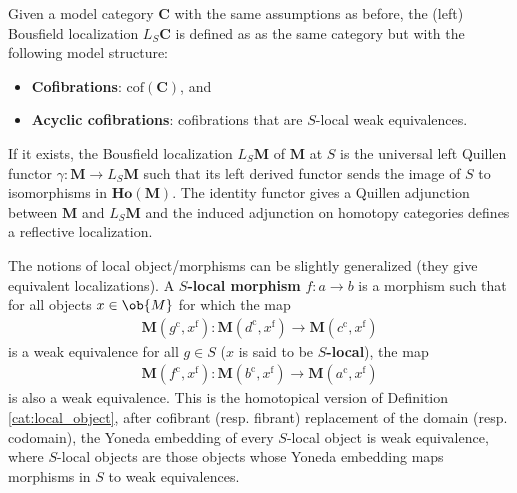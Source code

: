     \begin{construct}
        Given a model category $\mathbf{C}$ with the same assumptions as before, the (left) Bousfield localization $L_S\mathbf{C}$ is defined as as the same category but with the following model structure:
        \begin{itemize}
            \item\textbf{Cofibrations}: $\mathrm{cof}(\mathbf{C})$, and
            \item\textbf{Acyclic cofibrations}: cofibrations that are $S$-local weak equivalences.
        \end{itemize}
        If it exists, the Bousfield localization $L_S\mathbf{M}$ of $\mathbf{M}$ at $S$ is the universal left Quillen functor $\gamma:\mathbf{M}\rightarrow L_S\mathbf{M}$ such that its left derived functor sends the image of $S$ to isomorphisms in $\mathbf{Ho}(\mathbf{M})$. The identity functor gives a Quillen adjunction between $\mathbf{M}$ and $L_S\mathbf{M}$ and the induced adjunction on homotopy categories defines a reflective localization.
    \end{construct}
    \begin{remark}
        The notions of local object/morphisms can be slightly generalized (they give equivalent localizations). A \textbf{$S$-local morphism} $f:a\rightarrow b$ is a morphism such that for all objects $x\in\ob{M}$ for which the map
        \begin{gather}
            \mathbf{M}(g^\mathrm{c},x^\mathrm{f}):\mathbf{M}(d^\mathrm{c},x^\mathrm{f})\rightarrow\mathbf{M}(c^\mathrm{c},x^\mathrm{f})
        \end{gather}
        is a weak equivalence for all $g\in S$ ($x$ is said to be \textbf{$S$-local}), the map
        \begin{gather}
            \mathbf{M}(f^\mathrm{c},x^\mathrm{f}):\mathbf{M}(b^\mathrm{c},x^\mathrm{f})\rightarrow\mathbf{M}(a^\mathrm{c},x^\mathrm{f})
        \end{gather}
        is also a weak equivalence. This is the homotopical version of Definition \ref{cat:local_object}, after cofibrant (resp. fibrant) replacement of the domain (resp. codomain), the Yoneda embedding of every $S$-local object is weak equivalence, where $S$-local objects are those objects whose Yoneda embedding maps morphisms in $S$ to weak equivalences.
    \end{remark}


